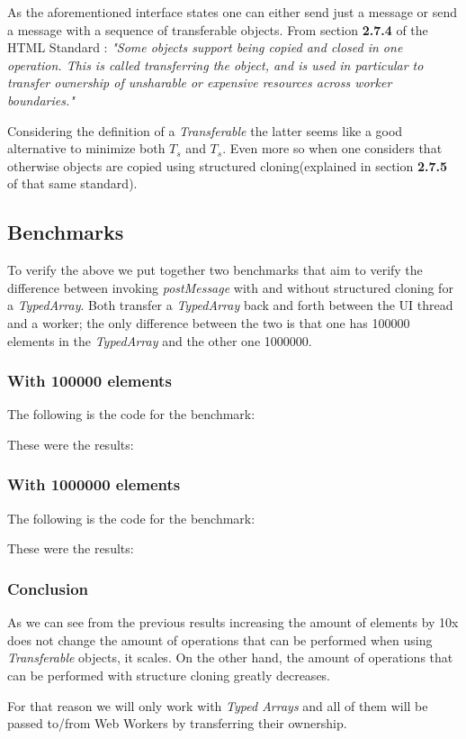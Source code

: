 As the aforementioned interface states one can either send just a message or send a message with a sequence of transferable objects. From section \textbf{2.7.4} of the HTML Standard \cite{html}:
\textit{"Some objects support being copied and closed in one operation. This is called transferring the object, and is used in particular to transfer ownership of unsharable or expensive resources across worker boundaries."}

Considering the definition of a \textit{Transferable} the latter seems like a good alternative to minimize both \(T_{s}\) and \(T_{s}\). Even more so when one considers that otherwise objects are copied using structured cloning(explained in section \textbf{2.7.5} of that same standard).

\subsection{Benchmarks}
To verify the above we put together two benchmarks that aim to verify the difference between invoking \textit{postMessage} with and without structured cloning for a \textit{TypedArray}. Both transfer a \textit{TypedArray} back and forth between the UI thread and a worker; the only difference between the two is that one has 100000 elements in the \textit{TypedArray} and the other one 1000000.

\subsubsection{With 100000 elements}
The following is the code for the benchmark:

These were the results:

\subsubsection{With 1000000 elements}
The following is the code for the benchmark:

These were the results:

\subsubsection{Conclusion}
As we can see from the previous results increasing the amount of elements by 10x does not change the amount of operations that can be performed when using \textit{Transferable} objects, it scales. On the other hand, the amount of operations that can be performed with structure cloning greatly decreases.

For that reason we will only work with \textit{Typed Arrays} and all of them will be passed to/from Web Workers by transferring their ownership.

\pagebreak